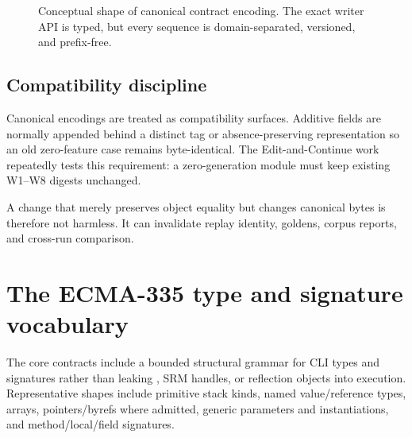 \documentclass[11pt,oneside,openany]{book}
\newcommand{\typeName}[1]{\texttt{\detokenize{#1}}}
\begin{document}
\begin{figure}[htbp]
\centering
{}
\caption{Conceptual shape of canonical contract encoding. The exact writer API is typed, but every sequence is domain-separated, versioned, and prefix-free.}
\end{figure}

\subsection{Compatibility discipline}

Canonical encodings are treated as compatibility surfaces. Additive fields are normally appended behind a distinct tag or absence-preserving representation so an old zero-feature case remains byte-identical. The Edit-and-Continue work repeatedly tests this requirement: a zero-generation module must keep existing W1--W8 digests unchanged.

A change that merely preserves object equality but changes canonical bytes is therefore not harmless. It can invalidate replay identity, goldens, corpus reports, and cross-run comparison.

\section{The ECMA-335 type and signature vocabulary}

The core contracts include a bounded structural grammar for CLI types and signatures rather than leaking \typeName{System.Type}, SRM handles, or reflection objects into execution. Representative shapes include primitive stack kinds, named value/reference types, arrays, pointers/byrefs where admitted, generic parameters and instantiations, and method/local/field signatures.
\end{document}

